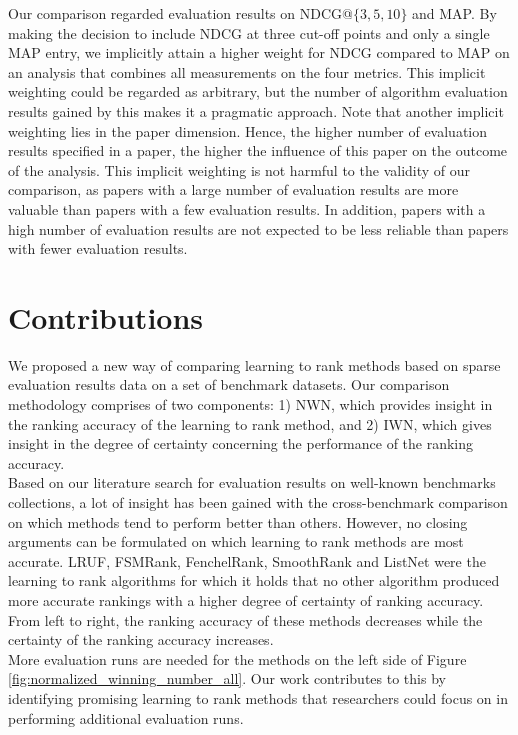 \documentclass[english, authoryear, preprint]{elsarticle}
\begin{document}
Our comparison regarded evaluation results on NDCG@$\{3,5,10\}$ and MAP. By making the decision to include NDCG at three cut-off points and only a single MAP entry, we implicitly attain a higher weight for NDCG compared to MAP on an analysis that combines all measurements on the four metrics. This implicit weighting could be regarded as arbitrary, but the number of algorithm evaluation results gained by this makes it a pragmatic approach. Note that another implicit weighting lies in the paper dimension. Hence, the higher number of evaluation results specified in a paper, the higher the influence of this paper on the outcome of the analysis. This implicit weighting is not harmful to the validity of our comparison, as papers with a large number of evaluation results are more valuable than papers with a few evaluation results. In addition, papers with a high number of evaluation results are not expected to be less reliable than papers with fewer evaluation results.

\section{Contributions}
We proposed a new way of comparing learning to rank methods based on sparse evaluation results data on a set of benchmark datasets. Our comparison methodology comprises of two components: 1) NWN, which provides insight in the ranking accuracy of the learning to rank method, and 2) IWN, which gives insight in the degree of certainty concerning the performance of the ranking accuracy.\\

Based on our literature search for evaluation results on well-known benchmarks collections, a lot of insight has been gained with the cross-benchmark comparison on which methods tend to perform better than others. However, no closing arguments can be formulated on which learning to rank methods are most accurate. LRUF, FSMRank, FenchelRank, SmoothRank and ListNet were the learning to rank algorithms for which it holds that no other algorithm produced more accurate rankings with a higher degree of certainty of ranking accuracy. From left to right, the ranking accuracy of these methods decreases while the certainty of the ranking accuracy increases.\\

More evaluation runs are needed for the methods on the left side of Figure \ref{fig:normalized_winning_number_all}. Our work contributes to this by identifying promising learning to rank methods that researchers could focus on in performing additional evaluation runs.
\end{document}

